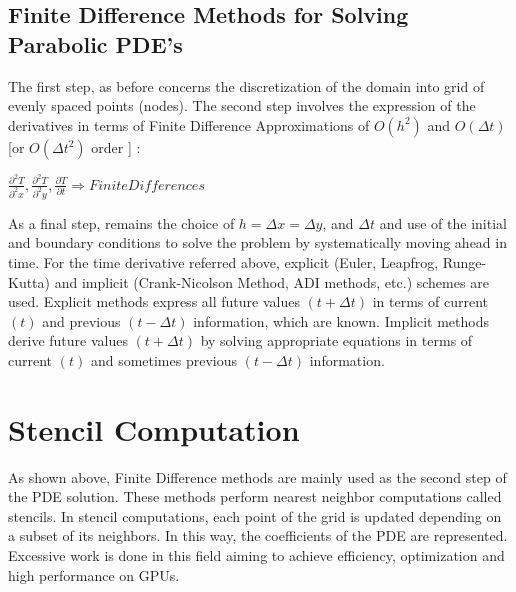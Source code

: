 \subsection{Finite Difference Methods for Solving Parabolic PDE's}
The first step, as before concerns the discretization of the domain into grid of evenly spaced points (nodes). The second step involves the expression of the derivatives in terms of Finite Difference Approximations of $O(h^2)$ and $O(Δt)$ [or $O(Δt^2)$ order ] :

$\frac{\partial^2 T}{\partial^2 x} , \frac{\partial^2 T}{\partial^2 y} , \frac{\partial T}{\partial t}  \Longrightarrow Finite   Differences $

As a final step, remains the choice of $h = Δx = Δy$, and $Δt$ and use of the initial and boundary conditions to solve the problem by systematically moving ahead in time. For the time derivative referred above, explicit (Euler, Leapfrog, Runge-Kutta) and implicit (Crank-Nicolson Method, ADI methods, etc.) schemes are used. Explicit methods express all future values $(t + Δt)$ in terms of current $(t)$ and previous $(t - Δt)$ information, which are known. Implicit methods derive future values $(t + Δt)$ by solving appropriate equations in terms of current $(t)$ and sometimes previous $(t - Δt)$ information.

\section{Stencil Computation}
As shown above, Finite Difference methods are mainly used as the second step of the PDE solution. These methods perform nearest neighbor computations called stencils. In stencil computations, each point of the grid is updated depending on a subset of its neighbors. In this way, the coefficients of the PDE are represented. Excessive work is done in this field aiming to achieve efficiency, optimization and high performance on GPUs. 


